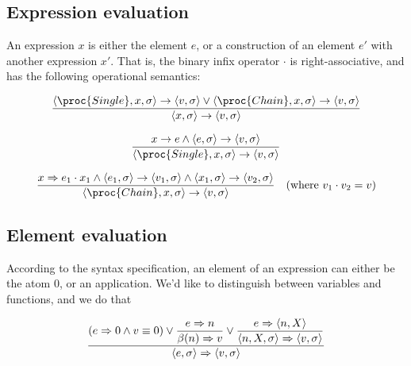 \subsection{Expression evaluation}

An expression $x$ is either the element $e$, or a construction of an element
$e'$ with another expression $x'$. That is, the binary infix operator $\cdot$
is right-associative, and has the following operational semantics:

\everymath{\displaystyle}

\begin{equation}
{\displaystyle
  \left\langle \proc{Single}, x,\sigma\right\rangle
  \rightarrow
  \left\langle v,\sigma\right\rangle
\vee
  \left\langle \proc{Chain}, x,\sigma\right\rangle
  \rightarrow
  \left\langle v,\sigma\right\rangle
\over\displaystyle
  \left\langle x,\sigma\right\rangle
  \rightarrow
  \left\langle v,\sigma\right\rangle
}
\end{equation}

\begin{equation}
{\displaystyle
  x\rightarrow e
\wedge
  \left\langle e,\sigma\right\rangle
  \rightarrow
  \left\langle v,\sigma\right\rangle
\over\displaystyle
  \left\langle \proc{Single}, x,\sigma\right\rangle
  \rightarrow
  \left\langle v,\sigma\right\rangle
}
\end{equation}

\begin{equation}
{\displaystyle
  x\Rightarrow e_1\cdot x_1
\wedge
  \left\langle e_1,\sigma\right\rangle
  \rightarrow
  \left\langle v_1,\sigma\right\rangle
\wedge
  \left\langle x_1,\sigma\right\rangle
  \rightarrow
  \left\langle v_2,\sigma\right\rangle
\over\displaystyle
  \left\langle \proc{Chain}, x, \sigma\right\rangle
  \rightarrow
  \left\langle v, \sigma\right\rangle
}
\quad(\text{where }v_1\cdot v_2=v)
\end{equation}

\subsection{Element evaluation}

According to the syntax specification, an element of an expression can either
be the atom $0$, or an application. We'd like to distinguish between variables
and functions, and we do that  

\begin{equation}
{\displaystyle
\left(
    e\Rightarrow 0
  \wedge
    v\equiv 0
\right)
\vee
{\displaystyle
    e\Rightarrow n
\over\displaystyle
    \beta(n)\Rightarrow v
}
\vee
{\displaystyle
    e\Rightarrow \left\langle n, X\right\rangle
\over\displaystyle
    \left\langle n,X,\sigma\right\rangle
    \Rightarrow
    \left\langle v,\sigma\right\rangle
}
\over\displaystyle
\left\langle e,\sigma\right\rangle
\Rightarrow
\left\langle v,\sigma\right\rangle
}
\end{equation}

